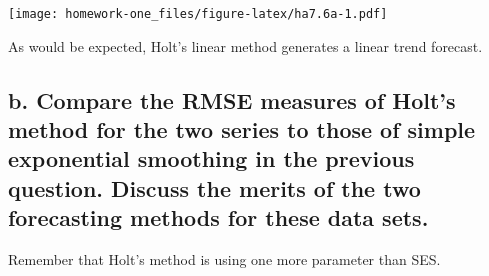 \documentclass[openany]{book}
\newenvironment{Shaded}{\begin{snugshade}}{\end{snugshade}}
\newcommand{\DataTypeTok}[1]{\textcolor[rgb]{0.13,0.29,0.53}{#1}}
\newcommand{\DecValTok}[1]{\textcolor[rgb]{0.00,0.00,0.81}{#1}}
\newcommand{\FloatTok}[1]{\textcolor[rgb]{0.00,0.00,0.81}{#1}}
\newcommand{\KeywordTok}[1]{\textcolor[rgb]{0.13,0.29,0.53}{\textbf{#1}}}
\newcommand{\NormalTok}[1]{#1}
\newcommand{\OperatorTok}[1]{\textcolor[rgb]{0.81,0.36,0.00}{\textbf{#1}}}
\newcommand{\StringTok}[1]{\textcolor[rgb]{0.31,0.60,0.02}{#1}}
\renewenvironment{quote}{\begin{myquote}}{\end{myquote}}
\begin{document}
\begin{Shaded}
\end{Shaded}

\texttt{[image: homework-one\_files/figure-latex/ha7.6a-1.pdf]}

As would be expected, Holt's linear method generates a linear trend forecast.

\hypertarget{b.-compare-the-rmse-measures-of-holts-method-for-the-two-series-to-those-of-simple-exponential-smoothing-in-the-previous-question.-discuss-the-merits-of-the-two-forecasting-methods-for-these-data-sets.}{%
\subsection{b. Compare the RMSE measures of Holt's method for the two series to those of simple exponential smoothing in the previous question. Discuss the merits of the two forecasting methods for these data sets.}\label{b.-compare-the-rmse-measures-of-holts-method-for-the-two-series-to-those-of-simple-exponential-smoothing-in-the-previous-question.-discuss-the-merits-of-the-two-forecasting-methods-for-these-data-sets.}}

\begin{quote}
Remember that Holt's method is using one more parameter than SES.
\end{quote}
\end{document}
